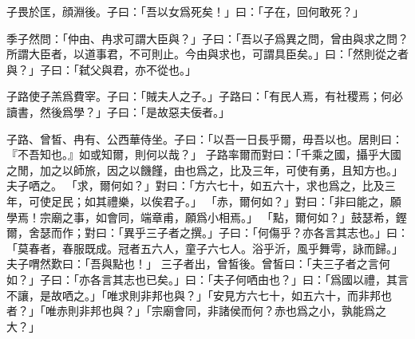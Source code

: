 子畏於匡，顔淵後。子曰：「吾以女爲死矣！」曰：「子在，回何敢死？」

季子然問：「仲由、冉求可謂大臣與？」子曰：「吾以子爲異之問，曾由與求之問？所謂大臣者，以道事君，不可則止。今由與求也，可謂具臣矣。」曰：「然則從之者與？」子曰：「弑父與君，亦不從也。」

子路使子羔爲費宰。子曰：「賊夫人之子。」子路曰：「有民人焉，有社稷焉；何必讀書，然後爲學？」子曰：「是故惡夫佞者。」

子路、曾皙、冉有、公西華侍坐。子曰：「以吾一日長乎爾，毋吾以也。居則曰：『不吾知也。』如或知爾，則何以哉？」
子路率爾而對曰：「千乘之國，攝乎大國之閒，加之以師旅，因之以饑饉，由也爲之，比及三年，可使有勇，且知方也。」夫子哂之。
「求，爾何如？」對曰：「方六七十，如五六十，求也爲之，比及三年，可使足民；如其禮樂，以俟君子。」
「赤，爾何如？」對曰：「非曰能之，願學焉！宗廟之事，如會同，端章甫，願爲小相焉。」
「點，爾何如？」鼓瑟希，鏗爾，舍瑟而作；對曰：「異乎三子者之撰。」子曰：「何傷乎？亦各言其志也。」曰：「莫春者，春服既成。冠者五六人，童子六七人。浴乎沂，風乎舞雩，詠而歸。」夫子喟然歎曰：「吾與點也！」
三子者出，曾皙後。曾皙曰：「夫三子者之言何如？」子曰：「亦各言其志也已矣。」曰：「夫子何哂由也？」曰：「爲國以禮，其言不讓，是故哂之。」「唯求則非邦也與？」「安見方六七十，如五六十，而非邦也者？」「唯赤則非邦也與？」「宗廟會同，非諸侯而何？赤也爲之小，孰能爲之大？」
